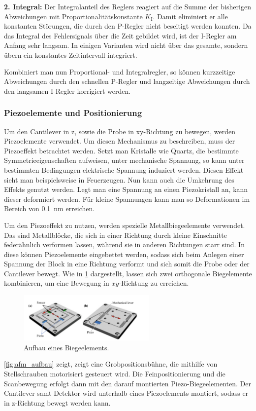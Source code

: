 \textbf{2. Integral:}
Der Integralanteil des Reglers reagiert auf die Summe der bisherigen Abweichungen mit Proportionalitätskonstante
$K_{\mathrm{I}}$.
Damit eliminiert er alle konstanten Störungen, die durch den P-Regler nicht beseitigt werden konnten.
Da das Integral des Fehlersignals über die Zeit gebildet wird, ist der I-Regler am Anfang sehr langsam.
In einigen Varianten wird nicht über das gesamte, sondern übern ein konstantes Zeitintervall integriert.
\autocite[102-104]{afm-buch}

Kombiniert man nun Proportional- und Integralregler, so können kurzzeitige Abweichungen durch den schnellen
P-Regler und langzeitige Abweichungen durch den langsamen I-Regler korrigiert werden.

\subsubsection{Piezoelemente und Positionierung}
Um den Cantilever in $\mathrm{z}$, sowie die Probe in $\mathrm{xy}$-Richtung zu bewegen, werden Piezoelemente verwendet.
Um diesen Mechanismus zu beschreiben, muss der Piezoeffekt betrachtet werden.
Setzt man Kristalle wie Quartz, die bestimmte Symmetrieeigenschaften aufweisen, unter mechanische Spannung,
so kann unter bestimmten Bedingungen elektrische Spannung induziert werden.
Diesen Effekt sieht man beispielsweise in Feuerzeugen.
Nun kann auch die Umkehrung des Effekts genutzt werden.
Legt man eine Spannung an einen Piezokristall an, kann dieser deformiert werden.
Für kleine Spannungen kann man so Deformationen im Bereich von \qty{0.1}{\nano\meter} erreichen.
\autocite[35-36]{afm-buch}

Um den Piezoeffekt zu nutzen, werden spezielle Metallbiegeelemente verwendet.
Das sind Metallblöcke, die sich in einer Richtung durch kleine Einschnitte federähnlich verformen lassen, während
sie in anderen Richtungen starr sind.
In diese können Piezoelemente eingebettet werden, sodass sich beim Anlegen einer Spannung der Block in eine Richtung
verformt und sich somit die Probe oder der Cantilever bewegt.
Wie in \cref{fig:afm_stage} dargestellt, lassen sich zwei orthogonale Biegelemente kombinieren, um eine Bewegung in
$xy$-Richtung zu erreichen.
\begin{figure}
    \centering
    \includegraphics[width=0.6\textwidth]{../assets/messmethoden/afm/04_stage}
    \caption{Aufbau eines Biegeelements. }
    \label{fig:afm_stage}
\end{figure}
\cref{fig:afm_aufbau} zeigt, zeigt eine Grobpositionsbühne, die
mithilfe von Stellschrauben motorisiert gesteuert wird.
Die Feinpositionierung und die Scanbewegung erfolgt dann mit den darauf montierten Piezo-Biegeelementen.
Der Cantilever samt Detektor wird unterhalb eines Piezoelements montiert, sodass er in $\mathrm{z}$-Richtung bewegt
werden kann.
\autocite[79-80]{afm-buch}


